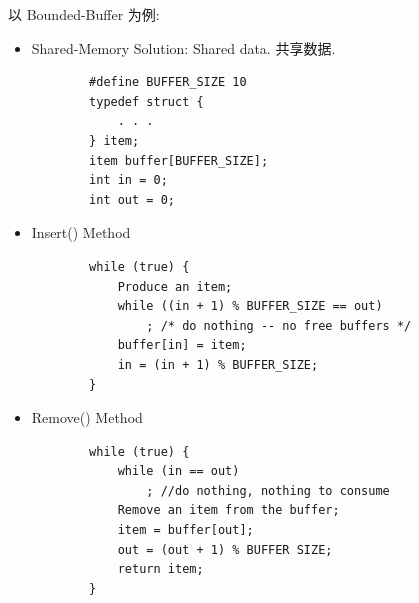 以 Bounded-Buffer 为例:
\begin{itemize}
    \item Shared-Memory Solution: Shared data. 共享数据. 
    \begin{verbatim}
        #define BUFFER_SIZE 10
        typedef struct {
            . . .
        } item;
        item buffer[BUFFER_SIZE];
        int in = 0;
        int out = 0;
    \end{verbatim}
    \item Insert() Method
    \begin{verbatim}
        while (true) {
            Produce an item;
            while ((in + 1) % BUFFER_SIZE == out) 
                ; /* do nothing -- no free buffers */
            buffer[in] = item;
            in = (in + 1) % BUFFER_SIZE;
        }
    \end{verbatim}
    \item Remove() Method
    \begin{verbatim}
        while (true) {
            while (in == out)
                ; //do nothing, nothing to consume
            Remove an item from the buffer;
            item = buffer[out];
            out = (out + 1) % BUFFER SIZE;
            return item;
        }
    \end{verbatim}
\end{itemize}



